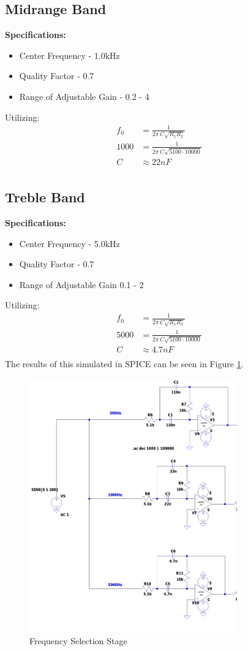 \documentclass[12pt]{article}
\begin{document}
\subsection{Midrange Band}
\noindent \textbf{Specifications:}
\begin{itemize}
	\item Center Frequency - 1.0kHz
	\item Quality Factor - 0.7
	\item Range of Adjustable Gain - 0.2 - 4
\end{itemize}
Utilizing:
\begin{align*}
	f_0  & = \frac{1}{2\pi\,C\sqrt{R_1R_2}}         \\
	1000 & = \frac{1}{2\pi\,C\sqrt{5100\cdot10000}} \\
	C    & \approx 22nF                             \\
\end{align*}
\subsection{Treble Band}
\noindent \textbf{Specifications:}
\begin{itemize}
	\item Center Frequency - 5.0kHz
	\item Quality Factor - 0.7
	\item Range of Adjustable Gain 0.1 - 2
\end{itemize}
Utilizing:
\begin{align*}
	f_0  & = \frac{1}{2\pi\,C\sqrt{R_1R_2}}         \\
	5000 & = \frac{1}{2\pi\,C\sqrt{5100\cdot10000}} \\
	C    & \approx 4.7nF                            \\
\end{align*}
The results of this simulated in SPICE can be seen  in Figure \ref{fig:mfbstage}.
\begin{figure}[H]
	\centering
	\includegraphics[width=0.8\textwidth]{mfbstage}
	\caption{Frequency Selection Stage}
	\label{fig:mfbstage}
\end{figure}
\end{document}
